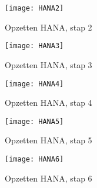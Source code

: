             \begin{figure}	
                \centering
                \texttt{[image: HANA2]}
                \caption{Opzetten HANA, stap 2} \label{HANA2}
            \end{figure}
            
            \begin{figure}	
                \centering
                \texttt{[image: HANA3]}
                \caption{Opzetten HANA, stap 3} \label{HANA3}
            \end{figure}
        
            \begin{figure}	
                \centering
                \texttt{[image: HANA4]}
                \caption{Opzetten HANA, stap 4} \label{HANA4}
            \end{figure}
        
            \begin{figure}	
                \centering
                \texttt{[image: HANA5]}
                \caption{Opzetten HANA, stap 5} \label{HANA5}
            \end{figure}
        
            \begin{figure}	
                \centering
                \texttt{[image: HANA6]}
                \caption{Opzetten HANA, stap 6} \label{HANA6}
            \end{figure}
            
